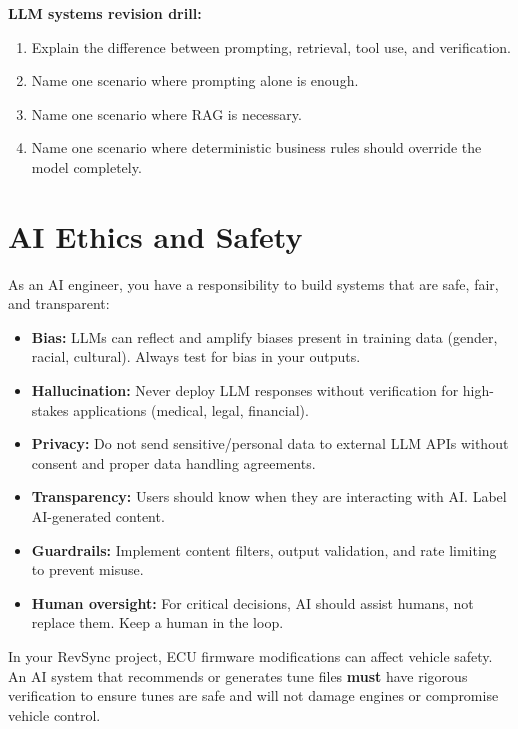 \documentclass[12pt, a4paper, oneside]{book}
\begin{document}
\begin{exercisebox}
\textbf{LLM systems revision drill:}
\begin{enumerate}[leftmargin=2em]
    \item Explain the difference between prompting, retrieval, tool use, and verification.
    \item Name one scenario where prompting alone is enough.
    \item Name one scenario where RAG is necessary.
    \item Name one scenario where deterministic business rules should override the model completely.
\end{enumerate}
\end{exercisebox}

\section{AI Ethics and Safety}

As an AI engineer, you have a responsibility to build systems that are safe, fair, and transparent:

\begin{itemize}[leftmargin=2em]
    \item \textbf{Bias:} LLMs can reflect and amplify biases present in training data (gender, racial, cultural). Always test for bias in your outputs.
    \item \textbf{Hallucination:} Never deploy LLM responses without verification for high-stakes applications (medical, legal, financial).
    \item \textbf{Privacy:} Do not send sensitive/personal data to external LLM APIs without consent and proper data handling agreements.
    \item \textbf{Transparency:} Users should know when they are interacting with AI. Label AI-generated content.
    \item \textbf{Guardrails:} Implement content filters, output validation, and rate limiting to prevent misuse.
    \item \textbf{Human oversight:} For critical decisions, AI should assist humans, not replace them. Keep a human in the loop.
\end{itemize}

\begin{cautionbox}
In your RevSync project, ECU firmware modifications can affect vehicle safety. An AI system that recommends or generates tune files \textbf{must} have rigorous verification to ensure tunes are safe and will not damage engines or compromise vehicle control.
\end{cautionbox}
\end{document}

